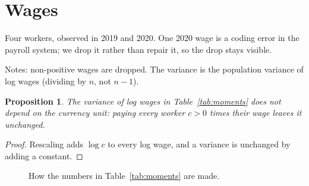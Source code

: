 \documentclass{article}
\newtheorem{proposition}{Proposition}
\begin{document}
\section{Wages}

Four workers, observed in 2019 and 2020. One 2020 wage is a coding error
in the payroll system; we drop it rather than repair it, so the drop
stays visible.

\begin{table}[t]
  \centering
  \caption{Log wage moments by year}\label{tab:moments}
  

  \footnotesize Notes: non-positive wages are dropped. The variance is
  the population variance of log wages (dividing by $n$, not $n-1$).
\end{table}

\begin{proposition}\label{prop:units}
  The variance of log wages in Table~\ref{tab:moments} does not depend on
  the currency unit: paying every worker $c > 0$ times their wage leaves
  it unchanged.
\end{proposition}

\begin{proof}
  Rescaling adds $\log c$ to every log wage, and a variance is unchanged
  by adding a constant.
\end{proof}

\begin{figure}[h]
  \centering
  \caption{How the numbers in Table~\ref{tab:moments} are made.}\label{fig:flow}
\end{figure}
\end{document}
